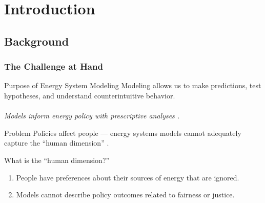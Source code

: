 \section{Introduction}

\subsection{Background}

\begin{frame}
    \frametitle{The Challenge at Hand}
    \begin{block}{Purpose of Energy System Modeling}
        Modeling allows us to make predictions, test hypotheses, and understand
        counterintuitive behavior.\\~\\
        \textit{Models inform energy policy with prescriptive analyses
        \cite{decarolis_using_2011}.}
    \end{block}
    \begin{block}{Problem} %
        Policies affect people --- energy systems models cannot adequately
        capture the ``human dimension'' \cite{pfenninger_energy_2014}.
    \end{block}
    \begin{block}{What is the ``human dimension?''}
        \begin{enumerate}
            \item People have preferences about their sources of energy that are
            ignored.
            \item Models cannot describe policy outcomes related to fairness or
            justice.
        \end{enumerate}
    \end{block}
\end{frame}

